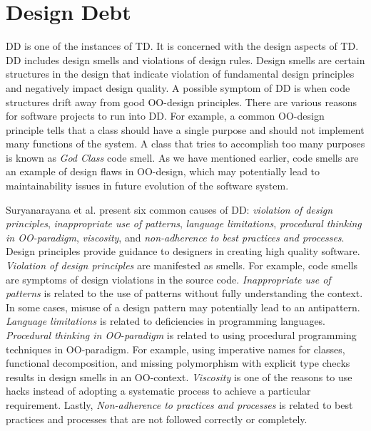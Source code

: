 \section{Design Debt}
\label{sec:designdebt}
DD is one of the instances of TD\cite{li2015systematic,Zazworka:2011:PDD:1985362.1985372,foser076-brown}. It is concerned with the design aspects of TD. DD includes design smells and violations of design rules\cite{suryanarayana2014refactoring}. Design smells are certain structures in the design that indicate violation of fundamental design principles and negatively impact design quality\cite{suryanarayana2014refactoring}. A possible symptom of DD is when code structures drift away from good OO-design principles\cite{zazworka2011investigating}. There are various reasons for software projects to run into DD. For example, a common OO-design principle tells that a class should have a single purpose and should not implement many functions of the system. A class that tries to accomplish too many purposes is known as \textit{God Class} code smell. As we have mentioned earlier, code smells are an example of design flaws in OO-design, which may potentially lead to maintainability issues in future evolution of the software system\cite{olbrich2009evolution}.

Suryanarayana et al.\cite{suryanarayana2014refactoring} present six common causes of DD: \textit{violation of design principles}, \textit{inappropriate use of patterns}, \textit{language limitations}, \textit{procedural thinking in OO-paradigm}, \textit{viscosity}, and \textit{non-adherence to best practices and processes}. Design principles provide guidance to designers in creating high quality software. \textit{Violation of design principles} are manifested as smells. For example, code smells are symptoms of design violations in the source code. \textit{Inappropriate use of patterns} is related to the use of patterns without fully understanding the context. In some cases, misuse of a design pattern may potentially lead to an antipattern. \textit{Language limitations} is related to deficiencies in programming languages. \textit{Procedural thinking in OO-paradigm} is related to using procedural programming techniques in OO-paradigm. For example, using imperative names for classes, functional decomposition, and missing polymorphism with explicit type checks results in design smells in an OO-context. \textit{Viscosity} is one of the reasons to use hacks instead of adopting a systematic process to achieve a particular requirement. Lastly, \textit{Non-adherence to practices and processes} is related to best practices and processes that are not followed correctly or completely. 




